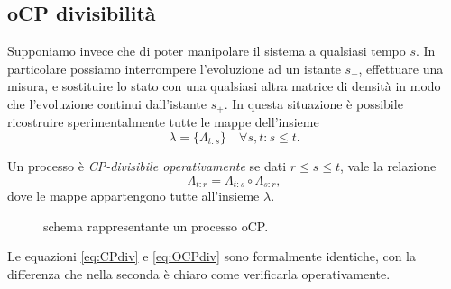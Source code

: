 \documentclass[a4]{article}
\begin{document}
\subsection{oCP divisibilità}
Supponiamo invece che di poter manipolare il sistema a qualsiasi tempo \(s\). In
particolare possiamo interrompere l'evoluzione ad un istante \(s_-\), effettuare una
misura, e sostituire lo stato con una qualsiasi altra matrice di densità in modo che
l'evoluzione continui dall'istante \(s_+\). In questa situazione è  possibile  ricostruire
sperimentalmente tutte le mappe dell'insieme
\[\lambda = \{\Lambda_{t\colon s}\}  \quad \forall s,t\colon s \le t.\]  
\begin{defn}
Un processo è \emph{CP-divisibile operativamente} se dati \(r \le s \le  t\), vale la
relazione 
\begin{equation} \label{eq:OCPdiv}
\Lambda_{t\colon r} = \Lambda_{t\colon s} \circ \Lambda_{s\colon r},
\end{equation}
dove le mappe appartengono tutte all'insieme \(\lambda\).
\end{defn}
\begin{figure}
	\centering
	\resizebox{0.9\textwidth}{!}{}
	\caption{schema rappresentante un processo oCP.}
\end{figure}
Le equazioni \eqref{eq:CPdiv} e \eqref{eq:OCPdiv} sono formalmente identiche, con la
differenza che nella seconda è chiaro come verificarla operativamente.
\end{document}

